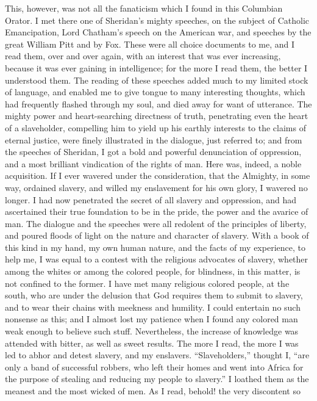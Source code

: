 This, however, was not all the fanaticism which I found in this
Columbian Orator. I met there one of Sheridan's mighty speeches, on the
subject of Catholic Emancipation, Lord Chatham's speech on the American
war, and speeches by the great William Pitt and by Fox. These were all
choice documents to me, and I read them, over and over again, with an
interest that was ever increasing, because it was ever gaining in
intelligence; for the more I read them, the better I understood them.
The reading of these speeches added much to my limited stock of
language, and enabled me to give tongue to many interesting thoughts,
which had frequently flashed through my soul, and died away for want of
utterance. The mighty power and heart-searching directness of truth,
penetrating even the heart of a slaveholder, compelling him to yield up
his earthly interests to the claims of eternal justice, were finely
illustrated in the dialogue, just referred to; and from the speeches of
Sheridan, I got a bold and powerful denunciation of oppression, and a
most brilliant vindication of the rights of man. Here was, indeed, a
noble acquisition. If I ever wavered under the consideration, that the
{}Almighty, in some way, ordained slavery, and willed my enslavement for
his own glory, I wavered no longer. I had now penetrated the secret of
all slavery and oppression, and had ascertained their true foundation to
be in the pride, the power and the avarice of man. The dialogue and the
speeches were all redolent of the principles of liberty, and poured
floods of light on the nature and character of slavery. With a book of
this kind in my hand, my own human nature, and the facts of my
experience, to help me, I was equal to a contest with the religious
advocates of slavery, whether among the whites or among the colored
people, for blindness, in this matter, is not confined to the former. I
have met many religious colored people, at the south, who are under the
delusion that God requires them to submit to slavery, and to wear their
chains with meekness and humility. I could entertain no such nonsense as
this; and I almost lost my patience when I found any colored man weak
enough to believe such stuff. Nevertheless, the increase of knowledge
was attended with bitter, as well as sweet results. The more I read, the
more I was led to abhor and detest slavery, and my enslavers.
``Slaveholders,'' thought I, ``are only a band of successful robbers,
who left their homes and went into Africa for the purpose of stealing
and reducing my people to slavery.'' I loathed them as the meanest and
the most wicked of men. As I read, behold! the very discontent so
